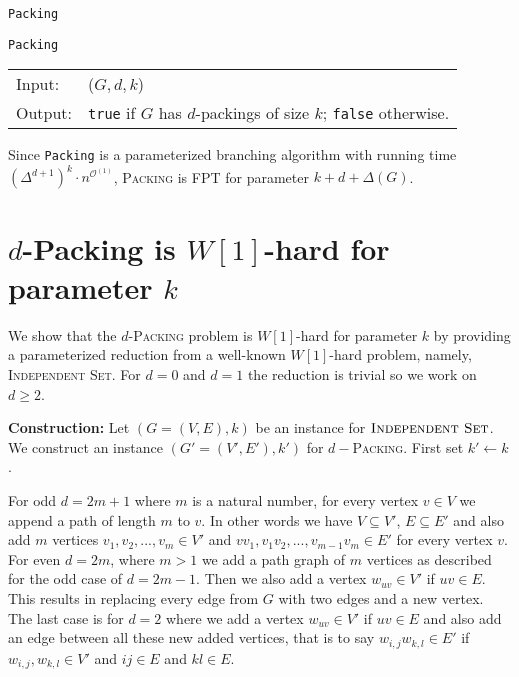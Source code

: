 \documentclass[10pt, a4paper]{article}
\theoremstyle{definition}
\newcommand{\mcO}{\mathcal{O}}
\newcommand{\n}{\\}
\begin{document}
\begin{algorithm}[H]
\caption{\texttt{Packing}}          %
\label{algo:packing} 
\texttt{Packing}\n
\begin{tabular}{l l}
 Input:  & ($G, d, k$) \n
 Output: & \texttt{true} if $G$ has $d$-packings of size $k$; \texttt{false} otherwise. \n
\end{tabular}	

\end{algorithm}

Since \texttt{Packing} is a parameterized branching algorithm with running time $(\Delta^{d+1})^k \cdot n^{\mcO^(1)}$, \textsc{Packing} is FPT for parameter $k + d + \Delta (G)$.

\clearpage
\section{$d$-\sc Packing \textnormal{is $W[1]$-hard for parameter $k$}}


We show that the $d$-\textsc{Packing} problem is $W[1]$-hard for parameter $k$ by providing a parameterized reduction from a well-known $W[1]$-hard problem, namely, \textsc{Independent Set}.	For $d = 0$ and $d = 1$ the reduction is trivial so we work on $d \geq 2$.

\textbf{Construction:} Let $(G = (V,E) ,k)$ be an instance for $\textsc{Independent Set}$. We construct an instance $(G' = (V',E'),k')$ for $d-$\textsc{Packing}. First set $k' \leftarrow k$. 

For odd $d = 2m+1$ where $m$ is a natural number, for every vertex $v \in V$ we append a path of length $m$ to $v$. In other words we have $V \subseteq V'$, $E \subseteq E'$ and also add $m$ vertices $v_1, v_2, ..., v_m \in V'$ and $vv_1, v_1v_2,...,v_{m-1}v_m \in E'$ for every vertex $v$.
For even $d = 2m$, where $m > 1$ we add a path graph of $m$ vertices as described for the odd case of $d = 2m - 1$. Then we also add a vertex $w_{uv} \in V'$ if $uv \in E$. This results in replacing every edge from $G$ with two edges and a new vertex.
The last case is for $d = 2$ where we add a vertex $w_{uv} \in V'$ if $uv \in E$ and also add an edge between all these new added vertices, that is to say $w_{i,j}w_{k,l} \in E'$ if $w_{i,j},w_{k,l} \in V'$ and $ij \in E$ and $kl \in E$.
\end{document}
